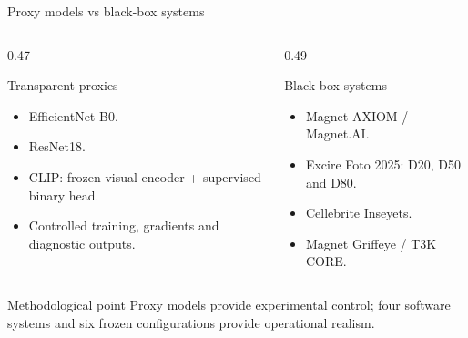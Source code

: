 \documentclass{beamer}
\begin{document}

\begin{frame}{Proxy models vs black-box systems}

\begin{columns}

\begin{column}{0.47\textwidth}
\begin{block}{Transparent proxies}
\begin{itemize}
    \item EfficientNet-B0.
    \item ResNet18.
    \item CLIP: frozen visual encoder + supervised binary head.
    \item Controlled training, gradients and diagnostic outputs.
\end{itemize}
\end{block}
\end{column}

\begin{column}{0.49\textwidth}
\begin{block}{Black-box systems}
\begin{itemize}
    \item Magnet AXIOM / Magnet.AI.
    \item Excire Foto 2025: D20, D50 and D80.
    \item Cellebrite Inseyets.
    \item Magnet Griffeye / T3K CORE.
\end{itemize}
\end{block}
\end{column}

\end{columns}

\begin{block}{Methodological point}
Proxy models provide experimental control; four software systems and six frozen configurations provide operational realism.
\end{block}

\end{frame}

\end{document}
